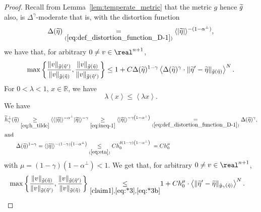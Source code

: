 \documentclass[AHL,Unicode,longabstracts,published]{cedram}
\newcommand*\eq[1]{\underset{(#1)}{=}}
\newcommand*\ineq[1]{\underset{(#1)}{\leq}}
\newcommand{\bbR}{\mathbb{R}}
\let\oldtilde\tilde
\renewcommand*{\tilde}[1]{\mathchoice{\widetilde{#1}}{\widetilde{#1}}{\oldtilde{#1}}{\oldtilde{#1}}}
\newcommand{\bbR}{\mathbb{R}}
\begin{document}
\begin{proof}
Recall from Lemma~\ref{lem:temperate_metric} that the metric $g$ hence $\tilde{g}$ also, is $\Delta^{\gamma}$-moderate that is, with the distortion function 
\[
\Delta(\tilde{\eta})\eq{\ref{eq:def_distortion_function_D-1}}\langle|\tilde{\eta}|\rangle^{-(1-\alpha^{\perp})},
\]
we have that, for arbitrary $0\neq v\in\real^{n+1}$,
\begin{equation}\label{claim1}
\max\left\{ \frac{\|v\|_{\tilde{g}\left(\tilde{\eta}'\right)}}{\|v\|_{\tilde{g}\left(\tilde{\eta}\right)}},\frac{\|v\|_{\tilde{g}\left(\tilde{\eta}\right)}}{\|v\|_{\tilde{g}\left(\tilde{\eta}'\right)}}\right\} \le1+C\Delta(\tilde{\eta})^{1-\gamma}\left\langle \Delta(\tilde{\eta})^{\gamma}\cdot\|\tilde{\eta}'-\tilde{\eta}\|_{\tilde{g}\left(\tilde{\eta}\right)}\right\rangle ^{N}.
\end{equation}
For $0<\lambda<1$, $x\in\bbR$, we have
\begin{equation}\label{eq:ineq-1}
\lambda\left\langle x\right\rangle \leq\left\langle \lambda x\right\rangle.
\end{equation}
We have
\begin{align}
\tilde{h}_{\gamma}^{\perp}(\tilde{\eta})\underset{\eqref{eq:h_tilde}}{\geq}\langle\langle|\tilde{\eta}|\rangle^{-\alpha^{\perp}}|\tilde{\eta}|\rangle^{-\gamma}\underset{\eqref{eq:ineq-1}}{\geq}\langle|\tilde{\eta}|\rangle^{-\gamma\left(1-\alpha^{\perp}\right)}&\eq{\ref{eq:def_distortion_function_D-1}}\Delta(\tilde{\eta})^{\gamma},\label{eq:*3}
\\
\intertext{and}
\Delta(\tilde{\eta})^{1-\gamma}=\langle|\tilde{\eta}|\rangle^{-\left(1-\gamma\right)\left(1-\alpha^{\perp}\right)}\ineq{\ref{eq:eta}}Ch_{0}^{\delta\left(1-\gamma\right)\left(1-\alpha^{\perp}\right)} &\mkern5mu =Ch_{0}^{\mu}\label{eq:*3b}
\end{align}
with $\mu=(1-\gamma)(1-\alpha^{\perp})<1$. We get that, for arbitrary $0\neq v\in\real^{n+1}$,
\begin{align}\label{claim3}
\max\left\{ \frac{\|v\|_{\tilde{g}\left(\tilde{\eta}\right)}}{\|v\|_{\tilde{g}\left(\tilde{\eta}'\right)}},\frac{\|v\|_{\tilde{g}\left(\tilde{\eta}'\right)}}{\|v\|_{\tilde{g}\left(\tilde{\eta}\right)}}\right\} \underset{\eqref{claim1},\eqref{eq:*3},\eqref{eq:*3b}}{\leq} & 1+Ch_{0}^{\mu}\cdot\left\langle \|\tilde{\eta}'-\tilde{\eta}\|_{\tilde{g}_{\gamma}\left(\tilde{\eta}\right)}\right\rangle ^{N}.
\end{align}


\end{proof}
\end{document}
